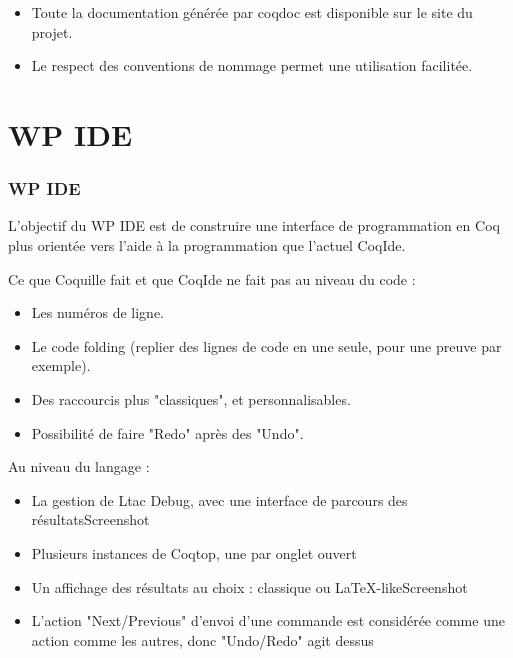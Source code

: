 \documentclass[slidetop]{beamer}
\begin{document}
\begin{frame}
\begin{itemize}
\item Toute la documentation générée par coqdoc est disponible sur le site du projet. 
\item Le respect des conventions de nommage permet une utilisation facilitée.
\end{itemize}
\end{frame}


\section{WP IDE}
\begin{frame}
\frametitle{WP IDE} 
L'objectif du WP IDE est de construire une interface de programmation en Coq plus orientée vers l'aide à la programmation que l'actuel CoqIde.
\end{frame}

\begin{frame}
Ce que Coquille fait et que CoqIde ne fait pas au niveau du code :
\begin{itemize}
    \item Les numéros de ligne.
    \item Le code folding (replier des lignes de code en une seule, pour une preuve par exemple).
    \item Des raccourcis plus "classiques", et personnalisables.
    \item Possibilité de faire "Redo" après des "Undo".
\end{itemize}
\end{frame}

\begin{frame}

Au niveau du langage :
\begin{itemize}
    \item La gestion de Ltac Debug, avec une interface de parcours des résultatsScreenshot
    \item Plusieurs instances de Coqtop, une par onglet ouvert
    \item Un affichage des résultats au choix : classique ou LaTeX-likeScreenshot
    \item L'action "Next/Previous" d'envoi d'une commande est considérée comme une action comme les autres, donc "Undo/Redo" agit dessus
\end{itemize}
 
\end{frame}
\end{document}
